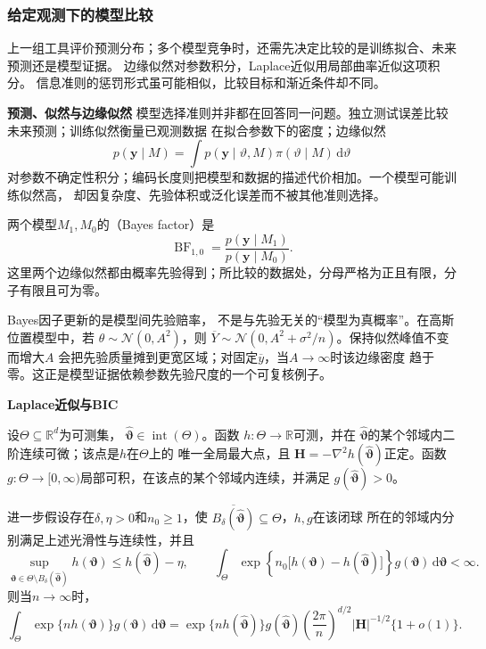 \subsubsection{给定观测下的模型比较}
\label{sec:statistics-model-evidence}
上一组工具评价预测分布；多个模型竞争时，还需先决定比较的是训练拟合、未来预测还是模型证据。
边缘似然对参数积分，Laplace近似用局部曲率近似这项积分。
信息准则的惩罚形式虽可能相似，比较目标和渐近条件却不同。

\par\medskip\noindent\textbf{预测、似然与边缘似然}\quad
模型选择准则并非都在回答同一问题。独立测试误差比较未来预测；训练似然衡量已观测数据
在拟合参数下的密度；边缘似然
\[
  p(\bm y\mid M)
  =\int p(\bm y\mid\vartheta,M)\pi(\vartheta\mid M)\,\mathrm d\vartheta
\]
对参数不确定性积分；编码长度则把模型和数据的描述代价相加。一个模型可能训练似然高，
却因复杂度、先验体积或泛化误差而不被其他准则选择。

\begin{definition}[Bayes因子]
  \label{def:statistics-bayes-factor}
两个模型\(M_1,M_0\)的（Bayes factor）是
\[
  \operatorname{BF}_{1,0}
  =\frac{p(\bm y\mid M_1)}{p(\bm y\mid M_0)}.
\]
这里两个边缘似然都由概率先验得到；所比较的数据处，分母严格为正且有限，分子有限且可为零。
\end{definition}
Bayes因子更新的是模型间先验赔率，
不是与先验无关的“模型为真概率”。在高斯位置模型中，若
\(\theta\sim\mathcal N(0,A^2)\)，则
\(\overline Y\sim\mathcal N(0,A^2+\sigma^2/n)\)。保持似然峰值不变而增大\(A\)
会把先验质量摊到更宽区域；对固定\(\overline y\)，当\(A\to\infty\)时该边缘密度
趋于零。这正是模型证据依赖参数先验尺度的一个可复核例子。

\par\medskip\noindent\textbf{Laplace近似与BIC}\quad
\begin{theorem}[固定维Laplace局部积分近似]
\label{thm:statistics-laplace-approximation}
设\(\Theta\subseteq\mathbb{R}^d\)为可测集，
\(\widehat{\bm\vartheta}\in\operatorname{int}(\Theta)\)。函数
\(h:\Theta\to\mathbb{R}\)可测，并在
\(\widehat{\bm\vartheta}\)的某个邻域内二阶连续可微；该点是\(h\)在\(\Theta\)上的
唯一全局最大点，且
\(\bm H=-\nabla^2h(\widehat{\bm\vartheta})\)正定。函数
\(g:\Theta\to[0,\infty)\)局部可积，在该点的某个邻域内连续，并满足
\(g(\widehat{\bm\vartheta})>0\)。

进一步假设存在\(\delta,\eta>0\)和\(n_0\geq1\)，使
\(\overline{B_\delta(\widehat{\bm\vartheta})}\subseteq\Theta\)，\(h,g\)在该闭球
所在的邻域内分别满足上述光滑性与连续性，并且
\[
  \sup_{\bm\vartheta\in
    \Theta\setminus B_\delta(\widehat{\bm\vartheta})}
  h(\bm\vartheta)
  \leq h(\widehat{\bm\vartheta})-\eta,
  \qquad
  \int_\Theta
  \exp\!\left\{n_0\bigl[h(\bm\vartheta)
    -h(\widehat{\bm\vartheta})\bigr]\right\}
  g(\bm\vartheta)\,\mathrm d\bm\vartheta<\infty.
\]
则当\(n\to\infty\)时，
\[
  \int_\Theta \exp\{n h(\bm\vartheta)\}g(\bm\vartheta)\,
  \mathrm d\bm\vartheta
  =
  \exp\{nh(\widehat{\bm\vartheta})\}
  g(\widehat{\bm\vartheta})
  \left(\frac{2\pi}{n}\right)^{d/2}
  |\bm H|^{-1/2}\{1+o(1)\}.
\]
\end{theorem}


